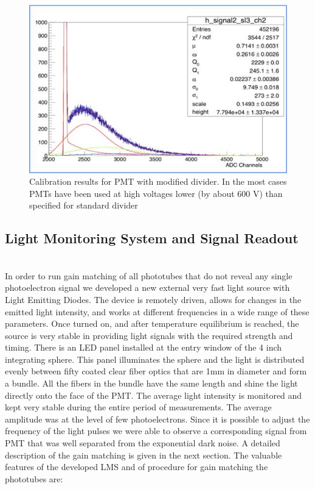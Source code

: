  \begin{figure}[!ht]
    \centering
    \includegraphics[width=1.0\linewidth,trim={0.0cm 0.0cm 0.0cm 0.0cm},clip]{images/POPOV_4.jpg}
    \caption{Calibration results for PMT with modified divider. In the most cases PMTs have been used at high voltages lower (by about 600 V) than specified for standard divider}
    \label{fig:POPOV_4}
\end{figure}

\subsection{Light Monitoring System and Signal Readout}
\indent
 \\
 \indent In order to run gain matching of all phototubes that do not reveal any single photoelectron signal we developed a new external very fast light source with Light Emitting Diodes. The device is remotely driven, allows for changes in the emitted light intensity, and works at different frequencies in a wide range of these parameters. Once turned on, and after temperature equilibrium is reached, the source is very stable in providing light signals with the required strength and timing. There is an LED panel installed at the entry window of the 4 inch integrating sphere. This panel illuminates the sphere and the light is distributed evenly between fifty coated clear fiber optics that are 1mm in diameter and form a bundle. All the fibers in the bundle have the same length and shine the light directly onto the face of the PMT. The average light intensity is monitored and kept very stable during the entire period of measurements. The average amplitude was at the level of few photoelectrons. Since it is possible to adjust the frequency of the light pulses we were able to observe a corresponding signal from PMT that was well separated from the exponential dark noise. A detailed description of the gain matching is given in the next section. The valuable features of the developed LMS and of procedure for gain matching the phototubes are:
 
